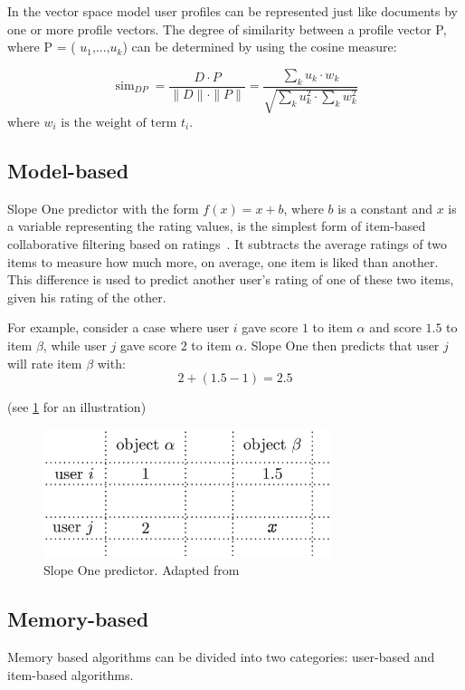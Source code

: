 \documentclass[10pt,twoside,english,a4paper]{article}
\begin{document}
In the vector space model user profiles can be represented just like documents by one 
or more profile vectors. The degree of similarity between a profile vector P, where 
P = ( \( u_1 \text{,...,} u_k \)) can be determined by using the cosine measure:\cite{LU228322}

\begin{equation*}\mathop{\text{sim}}\nolimits_{DP} = \frac{D \cdot P}{\|D\| \cdot \|P\|} = \frac{\sum\limits_k u_k \cdot w_k}{\sqrt{\sum\limits_k u_k^2 \cdot \sum\limits_k w_k^2}} \tag{4}\end{equation*}
where \( w_i \text{ is the weight of term } t_i \).

\subsection{Model-based}
Slope One predictor with the form \( f(x) = x + b \), where \( b \) is a constant and \( x \) is a variable representing the rating values, is the simplest form of item-based collaborative filtering based on ratings~\cite{doi:10.1137/1.9781611972757.43}. It subtracts the average ratings of two items to measure how much more, on average, one item is liked than another. This difference is used to predict another user's rating of one of these two items, given his rating of the other.

For example, consider a case where user \( i \) gave score \( 1 \) to item \( \alpha \) and score \( 1.5 \) to item \( \beta \), while user \( j \) gave score \( 2 \) to item \( \alpha \). Slope One then predicts that user \( j \) will rate item \( \beta \) with:
\[
2 + (1.5 - 1) = 2.5
\]

(see \ref{fig:fig3} for an illustration)

\begin{figure}[H]
    \centering
	\includegraphics[width=0.75\textwidth]{./diagrams/slope one predictor.jpg}
	\caption{Slope One predictor. Adapted from \cite{LU20121}}
	\label{fig:fig3}
\end{figure}

\subsection{Memory-based}
Memory based algorithms can be divided into two categories:
user-based\cite{WANG2017102} and item-based algorithms.
\medskip
\end{document}

